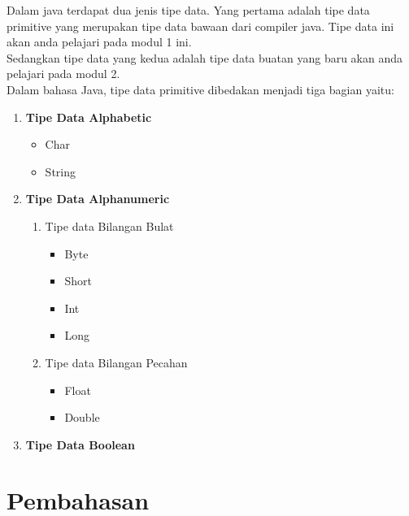 \documentclass[a4paper,12pt]{article}
\begin{document}
Dalam java terdapat dua jenis tipe data. Yang pertama adalah tipe data primitive 
yang merupakan tipe data bawaan dari compiler java. Tipe data ini akan anda pelajari 
pada modul 1 ini.\\ 
 
Sedangkan tipe data yang kedua adalah tipe data buatan yang baru akan anda 
pelajari pada modul 2.\\
 
Dalam bahasa Java, tipe data primitive dibedakan menjadi tiga bagian yaitu:
\begin{enumerate}[label=\bfseries\arabic*.]
    \item \textbf{Tipe Data Alphabetic}
        \begin{itemize}
           \item Char
           \item String
        \end{itemize}

    \item \textbf{Tipe Data Alphanumeric}
        \begin{enumerate}[label=\alph*. ]
                \item Tipe data Bilangan Bulat 
                    \begin{itemize}
                        \item Byte 
                        \item Short 
                        \item Int 
                        \item Long
                    \end{itemize}

                \item Tipe data Bilangan Pecahan
                    \begin{itemize}
                       \item Float
                       \item Double
                    \end{itemize}
        \end{enumerate}

    \item \textbf{Tipe Data Boolean}
\end{enumerate}

\newpage

\section{Pembahasan}
\end{document}
